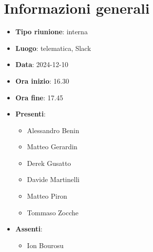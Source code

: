 \section{Informazioni generali}
\begin{itemize}
  \item \textbf{Tipo riunione}: interna
  \item \textbf{Luogo}: telematica, Slack
  \item \textbf{Data}: 2024-12-10
  \item \textbf{Ora inizio}: 16.30
  \item \textbf{Ora fine}: 17.45
  
  \item \textbf{Presenti}:
  \begin{itemize}
    \item Alessandro Benin
    \item Matteo Gerardin
    \item Derek Gusatto
    \item Davide Martinelli
    \item Matteo Piron
    \item Tommaso Zocche
  \end{itemize}

  \item \textbf{Assenti}:
   \begin{itemize}
   \item Ion Bourosu
  \end{itemize}
 
\end{itemize}